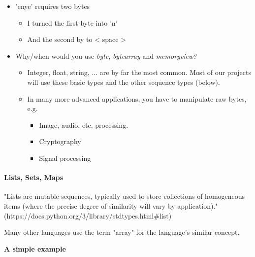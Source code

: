 \documentclass[11pt]{article}
\providecommand{\tightlist}{%
      \setlength{\itemsep}{0pt}\setlength{\parskip}{0pt}}
\begin{document}
    \begin{itemize}
\tightlist
\item
  'enye' requires two bytes

  \begin{itemize}
  \tightlist
  \item
    I turned the first byte into 'n'
  \item
    And the second by to \textless{} space \textgreater{}
  \end{itemize}
\item
  Why/when would you use \emph{byte}, \emph{bytearray} and
  \emph{memoryview?}

  \begin{itemize}
  \tightlist
  \item
    Integer, float, string, ... are by far the most common. Most of our
    projects will use these basic types and the other sequence types
    (below).
  \item
    In many more advanced applications, you have to manipulate raw
    bytes, e.g.

    \begin{itemize}
    \tightlist
    \item
      Image, audio, etc. processing.
    \item
      Cryptography
    \item
      Signal processing
    \end{itemize}
  \end{itemize}
\end{itemize}

    \paragraph{Lists, Sets, Maps}\label{lists-sets-maps}

"Lists are mutable sequences, typically used to store collections of
homogeneous items (where the precise degree of similarity will vary by
application)." (https://docs.python.org/3/library/stdtypes.html\#list)

Many other languages use the term "array" for the language's similar
concept.

\textbf{A simple example}
\end{document}
